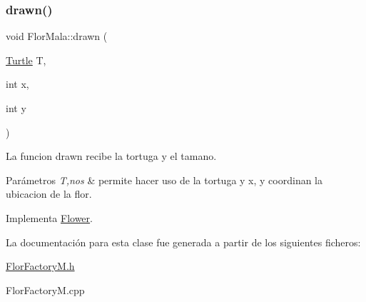 \subsubsection{\texorpdfstring{drawn()}{drawn()}}
{\footnotesize\ttfamily void Flor\+Mala\+::drawn (\begin{DoxyParamCaption}\item[{\hyperlink{classTurtle}{Turtle}}]{T,  }\item[{int}]{x,  }\item[{int}]{y }\end{DoxyParamCaption})\hspace{0.3cm}{\ttfamily [virtual]}}

La funcion drawn recibe la tortuga y el tamano. 
\begin{DoxyParams}{Parámetros}
{\em T,nos} & permite hacer uso de la tortuga y x, y coordinan la ubicacion de la flor. \\
\hline
\end{DoxyParams}


Implementa \hyperlink{classFlower_af01eea570f9d02e16cda1d86ee97633c}{Flower}.



La documentación para esta clase fue generada a partir de los siguientes ficheros\+:\begin{DoxyCompactItemize}
\item 
\hyperlink{FlorFactoryM_8h}{Flor\+Factory\+M.\+h}\item 
Flor\+Factory\+M.\+cpp\end{DoxyCompactItemize}
